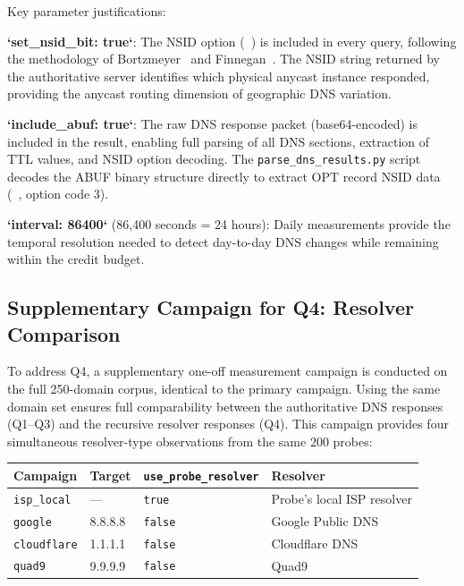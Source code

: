 Key parameter justifications:

\textbf{`set\_nsid\_bit: true`}: The \ac{NSID} option (~\cite{RFC5001}) is included in every query, following the methodology of Bortzmeyer~\cite{Bortzmeyer2013} and Finnegan~\cite{Finnegan2018}. The \ac{NSID} string returned by the authoritative server identifies which physical anycast instance responded, providing the anycast routing dimension of geographic \ac{DNS} variation.

\textbf{`include\_abuf: true`}: The raw \ac{DNS} response packet (base64-encoded) is included in the result, enabling full parsing of all \ac{DNS} sections, extraction of \ac{TTL} values, and \ac{NSID} option decoding. The \texttt{parse\_dns\_results.py} script decodes the ABUF binary structure directly to extract OPT record \ac{NSID} data (~\cite{RFC5001}, option code 3).

\textbf{`interval: 86400`} (86,400 seconds = 24 hours): Daily measurements provide the temporal resolution needed to detect day-to-day \ac{DNS} changes while remaining within the credit budget.

\subsection{Supplementary Campaign for Q4: Resolver Comparison}
\label{subsec:3.3.3}

To address Q4, a supplementary one-off measurement campaign is conducted on the full 250-domain corpus, identical to the primary campaign. Using the same domain set ensures full comparability between the authoritative \ac{DNS} responses (Q1--Q3) and the recursive resolver responses (Q4). This campaign provides four simultaneous resolver-type observations from the same 200 probes:

\begin{table}[H]
\centering
\small
\begin{tabular}{l l l l}
\toprule
\textbf{Campaign} & \textbf{Target} & \textbf{\texttt{use\_probe\_resolver}} & \textbf{Resolver} \\
\midrule
\texttt{isp\_local} & --- & \texttt{true} & Probe's local \ac{ISP} resolver \\
\texttt{google} & 8.8.8.8 & \texttt{false} & Google Public \ac{DNS} \\
\texttt{cloudflare} & 1.1.1.1 & \texttt{false} & Cloudflare \ac{DNS} \\
\texttt{quad9} & 9.9.9.9 & \texttt{false} & Quad9 \\
\bottomrule
\end{tabular}
\end{table}

